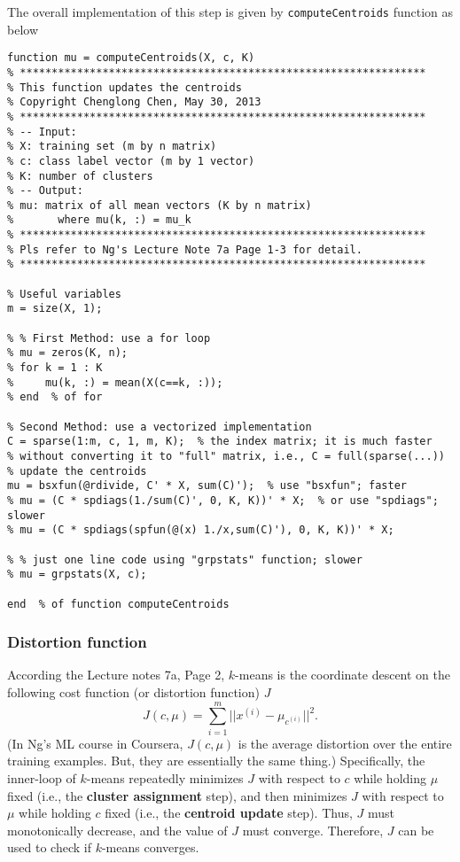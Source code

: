 \documentclass{article}
\begin{document}
The overall implementation of this step is given by \texttt{computeCentroids} function as below
\begin{verbatim}
function mu = computeCentroids(X, c, K)
% ****************************************************************
% This function updates the centroids
% Copyright Chenglong Chen, May 30, 2013
% ****************************************************************
% -- Input:
% X: training set (m by n matrix)
% c: class label vector (m by 1 vector)
% K: number of clusters
% -- Output:
% mu: matrix of all mean vectors (K by n matrix)
%       where mu(k, :) = mu_k
% ****************************************************************
% Pls refer to Ng's Lecture Note 7a Page 1-3 for detail.
% ****************************************************************

% Useful variables
m = size(X, 1);

% % First Method: use a for loop
% mu = zeros(K, n);
% for k = 1 : K
%     mu(k, :) = mean(X(c==k, :));
% end  % of for

% Second Method: use a vectorized implementation
C = sparse(1:m, c, 1, m, K);  % the index matrix; it is much faster
% without converting it to "full" matrix, i.e., C = full(sparse(...))
% update the centroids
mu = bsxfun(@rdivide, C' * X, sum(C)');  % use "bsxfun"; faster
% mu = (C * spdiags(1./sum(C)', 0, K, K))' * X;  % or use "spdiags"; slower
% mu = (C * spdiags(spfun(@(x) 1./x,sum(C)'), 0, K, K))' * X;

% % just one line code using "grpstats" function; slower
% mu = grpstats(X, c);

end  % of function computeCentroids
\end{verbatim}

\subsubsection{Distortion function}
According the Lecture notes 7a, Page 2, $k$-means is the coordinate descent on the following cost function (or distortion function) $J$
\[
J(c,\mu) = \sum_{i=1}^{m}||x^{(i)}-\mu_{c^{(i)}}||^2.
\]
(In Ng's ML course in Coursera, $J(c,\mu)$ is the average distortion over the entire training examples. But, they are essentially the same thing.) Specifically, the inner-loop of $k$-means repeatedly minimizes $J$ with respect to $c$ while holding $\mu$ fixed (i.e., the \textbf{cluster assignment} step), and then minimizes $J$ with respect to $\mu$ while holding $c$ fixed (i.e., the \textbf{centroid update} step). Thus, $J$ must monotonically decrease, and the value of $J$ must converge. Therefore, $J$ can be used to check if $k$-means converges.
\end{document}
